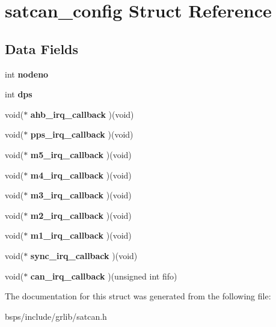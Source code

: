 \hypertarget{structsatcan__config}{}\section{satcan\+\_\+config Struct Reference}
\label{structsatcan__config}
\subsection*{Data Fields}
\begin{DoxyCompactItemize}
\item 
\mbox{\label{structsatcan__config_aeda1288bd983d3187c044b998e519deb}} 
int {\bfseries nodeno}
\item 
\mbox{\label{structsatcan__config_a5908338a17be4f1cfa26295be7c8f897}} 
int {\bfseries dps}
\item 
\mbox{\label{structsatcan__config_a0a9a42d243b368350b31bb3b8def8644}} 
void($\ast$ {\bfseries ahb\+\_\+irq\+\_\+callback} )(void)
\item 
\mbox{\label{structsatcan__config_a67ff3f3a47c0f74fa9c551c00f9a1e07}} 
void($\ast$ {\bfseries pps\+\_\+irq\+\_\+callback} )(void)
\item 
\mbox{\label{structsatcan__config_a399464caf33bf9df3ee55fb762cd0a08}} 
void($\ast$ {\bfseries m5\+\_\+irq\+\_\+callback} )(void)
\item 
\mbox{\label{structsatcan__config_a0b19a1b0cb914dc89f26371557483686}} 
void($\ast$ {\bfseries m4\+\_\+irq\+\_\+callback} )(void)
\item 
\mbox{\label{structsatcan__config_affa531a0a76f576b02d12b7a9c477e74}} 
void($\ast$ {\bfseries m3\+\_\+irq\+\_\+callback} )(void)
\item 
\mbox{\label{structsatcan__config_a252ba3c9f5e792b96ebda0c36610ed48}} 
void($\ast$ {\bfseries m2\+\_\+irq\+\_\+callback} )(void)
\item 
\mbox{\label{structsatcan__config_ad00e2afe9c3ea617909bbbc6e17311d5}} 
void($\ast$ {\bfseries m1\+\_\+irq\+\_\+callback} )(void)
\item 
\mbox{\label{structsatcan__config_a03aba83777fc8916dc966c9b9d9139ff}} 
void($\ast$ {\bfseries sync\+\_\+irq\+\_\+callback} )(void)
\item 
\mbox{\label{structsatcan__config_a18a6b9f969a6873d71625ae4e410d5c0}} 
void($\ast$ {\bfseries can\+\_\+irq\+\_\+callback} )(unsigned int fifo)
\end{DoxyCompactItemize}


The documentation for this struct was generated from the following file\+:\begin{DoxyCompactItemize}
\item 
bsps/include/grlib/satcan.\+h\end{DoxyCompactItemize}
